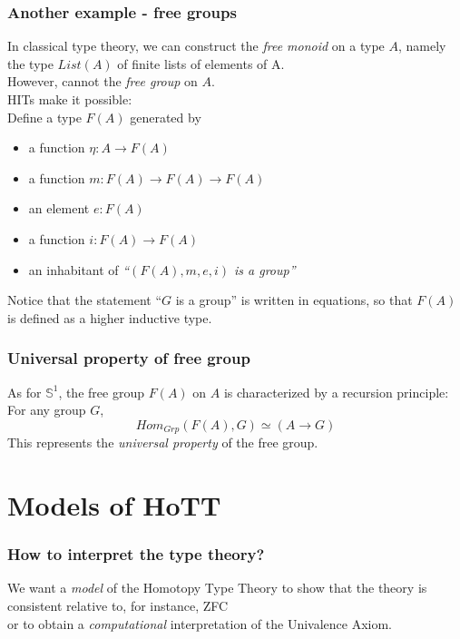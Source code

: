 \documentclass[dvipdfmx]{beamer}
\begin{document}
\begin{frame}
  \frametitle{Another example - free groups}
  In classical type theory,
  we can construct the {\it free monoid} on a type $A$,
  namely the type $List \left( A \right)$ of finite lists
  of elements of A.
  \pause
  \\
  However, cannot the {\it free group} on $A$.
  \pause
  \\
  HITs make it possible:
  \\
  Define a type $F \left( A \right)$ generated by
  \begin{itemize}
      \pause
    \item a function $\eta : A \to F \left( A \right)$
    \item a function $m : F \left( A \right) \to
      F \left( A \right) \to F \left( A \right)$
    \item an element $e : F \left( A \right)$
    \item a function $i : F \left( A \right) \to F \left( A \right)$
      \pause
    \item an inhabitant of
      {\it ``$\left( F \left( A \right) , m , e , i \right)$ is a group''}
  \end{itemize}
  \pause
  Notice that the statement ``$G$ is a group''
  is written in equations, so that
  $F \left( A \right)$ is defined as a higher inductive type.
\end{frame}

\begin{frame}
  \frametitle{Universal property of free group}
  As for ${\mathbb S}^1$,
  the free group $F \left( A \right)$ on $A$
  is characterized by a recursion principle:
  \\
  For any group $G$,
  \[
    Hom_{Grp} \left( F \left( A \right) , G \right)
    \simeq
    \left( A \to G \right)
  \]
  This represents the {\it universal property}
  of the free group.
\end{frame}

\section{Models of HoTT}

\begin{frame}
  \frametitle{How to interpret the type theory?}
  We want a {\it model} of the Homotopy Type Theory
  to show that the theory is consistent relative to,
  for instance, ZFC
  \\
  or
  to obtain a {\it computational} interpretation of
  the Univalence Axiom.\nocite{bezem_et_all:LIPIcs:20144628}
\end{frame}
\end{document}
